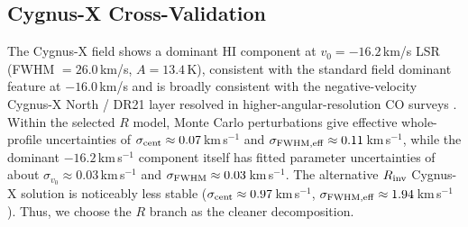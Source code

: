 \documentclass[10pt,preprint2]{aastex}
\begin{document}
\subsection{Cygnus-X Cross-Validation}
\label{sec:cygnus_x}


The Cygnus-X field shows a dominant HI component at $v_0 = -16.2$\,km/s LSR
(FWHM $= 26.0$\,km/s, $A = 13.4$\,K),
consistent with the standard field dominant feature at $-16.0$\,km/s and is
broadly consistent with the negative-velocity Cygnus-X North / DR21 layer
resolved in higher-angular-resolution CO surveys
\citep{schneider2006,gottschalk2012}. Within the selected $R$ model, Monte
Carlo perturbations give effective whole-profile uncertainties of
$\sigma_{\rm cent} \approx 0.07$\,km\,s$^{-1}$ and
$\sigma_{\rm FWHM,eff} \approx 0.11$\,km\,s$^{-1}$, while the dominant
$-16.2$\,km\,s$^{-1}$ component itself has fitted parameter uncertainties of
about $\sigma_{v_0} \approx 0.03$\,km\,s$^{-1}$ and
$\sigma_{\rm FWHM} \approx 0.03$\,km\,s$^{-1}$. The alternative
$R_{\rm inv}$ Cygnus-X solution is noticeably less stable
($\sigma_{\rm cent} \approx 0.97$\,km\,s$^{-1}$,
$\sigma_{\rm FWHM,eff} \approx 1.94$\,km\,s$^{-1}$). Thus, we choose the $R$ branch as the cleaner decomposition.


\end{document}
